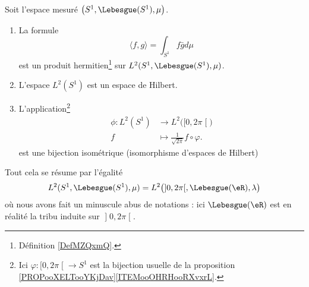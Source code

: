 \begin{proposition}     \label{PROPooDJERooYirMru}
	Soit l'espace mesuré \( \big( S^1,\Lebesgue(S^1), \mu \big)\).
	\begin{enumerate}
		\item
		      La formule
		      \begin{equation}        \label{EQooHPFQooEaujfZ}
			      \langle f, g\rangle =\int_{S^1}f\bar gd\mu
		      \end{equation}
		      est un produit hermitien\footnote{Définition \ref{DefMZQxmQ}.} sur \( L^2(S^1,\Lebesgue(S^1),\mu)\).
		\item
		      L'espace \( L^2(S^1)\) est un espace de Hilbert.
		\item       \label{ITEMooQZAPooKEeQBW}
		      L'application\footnote{Ici \(\varphi \colon \mathopen[ 0,2\pi\mathclose[\to S^1  \) est la bijection usuelle de la proposition \ref{PROPooXELTooYKjDav}\ref{ITEMooOHRHooRXvxrL}.}
		      \begin{equation}
			      \begin{aligned}
				      \phi\colon L^2(S^1) & \to L^2\big( \mathopen[ 0 , 2\pi \mathclose[ \big) \\
				      f                   & \mapsto \frac{1}{ \sqrt{ 2\pi } }f\circ \varphi.
			      \end{aligned}
		      \end{equation}
		      est une bijection isométrique (isomorphisme d'espaces de Hilbert)
	\end{enumerate}
	Tout cela se résume par l'égalité
	\begin{equation}
		L^2(S^1,\Lebesgue(S^1),\mu)=L^2\big( \mathopen] 0  , 2\pi \mathclose[,\Lebesgue(\eR),\lambda \big)
	\end{equation}
	où nous avons fait un minuscule abus de notations : ici \( \Lebesgue(\eR)\) est en réalité la tribu induite sur \( \mathopen] 0 , 2\pi \mathclose[\).
\end{proposition}


